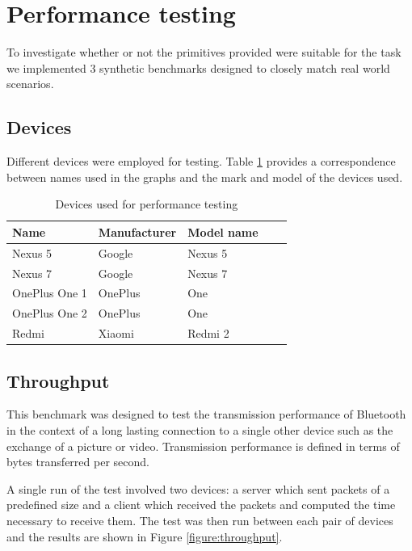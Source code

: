 \section{Performance testing}
To investigate whether or not the primitives provided were suitable for the task we implemented 3 synthetic benchmarks designed to closely match real world scenarios.

\subsection{Devices}
Different devices were employed for testing. Table \ref{table:devices-used} provides a correspondence between names used in the graphs and the mark and model of the devices 
used.

\begin{table}[h]
\centering
\caption{Devices used for performance testing}
\label{table:devices-used}
\begin{tabular}{lllll}
\hline
Name          & Manufacturer      & Model name    \\ \hline
Nexus 5       & Google            & Nexus 5       \\
Nexus 7       & Google            & Nexus 7       \\
OnePlus One 1 & OnePlus           & One           \\
OnePlus One 2 & OnePlus           & One           \\
Redmi         & Xiaomi            & Redmi 2       \\ 
\hline
\end{tabular}
\end{table}

\subsection{Throughput}
This benchmark was designed to test the transmission performance of Bluetooth in the context of a long lasting connection to a single other device such as the exchange of a picture or video.
Transmission performance is defined in terms of bytes transferred per second.

A single run of the test involved two devices: a server which sent packets of a predefined size and a client which received the packets and computed the time necessary to receive them.
The test was then run between each pair of devices and the results are shown in Figure \ref{figure:throughput}.

